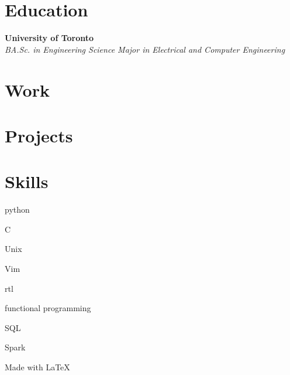 \documentclass{article}
\newcommand{\sectioncolor}{Violet}
\newcommand{\cvitem}[3]{\item[#1] \textbf{#2} \\ \textsl{#3}}
\newcommand{\cvsection}[2][black]{
    \renewcommand{\sectioncolor}{#1}
    \section*{#2}
}
\begin{document}
\cvsection[NavyBlue]{Education}

\begin{cvlist}
    \cvitem{2016}{University of Toronto}{\textnormal{BA.Sc. in Engineering
    Science Major in Electrical and Computer Engineering}}{}
\end{cvlist}

\cvsection[OliveGreen]{Work}

\begin{cvlist}
    
    
    
    
\end{cvlist}

\cvsection[Blue]{Projects}

\begin{cvlist}
    
\end{cvlist}

\cvsection[Green]{Skills}

\newcommand{\CC}{C\nolinebreak\hspace{-.05em}\raisebox{.4ex}{\tiny\bf +}\nolinebreak\hspace{-.10em}\raisebox{.4ex}{\tiny\bf +}}
\def\CC{{C\nolinebreak[4]\hspace{-.05em}\raisebox{.4ex}{\tiny\bf ++}}}

\begin{cvlist}
\begin{itemize*}
    \item python
    \item \CC
    \item Unix
    \item Vim
    \item rtl
    \item functional programming
    \item SQL
    \item Spark
\end{itemize*}
\end{cvlist}

\vfill

Made with \LaTeX
\end{document}
